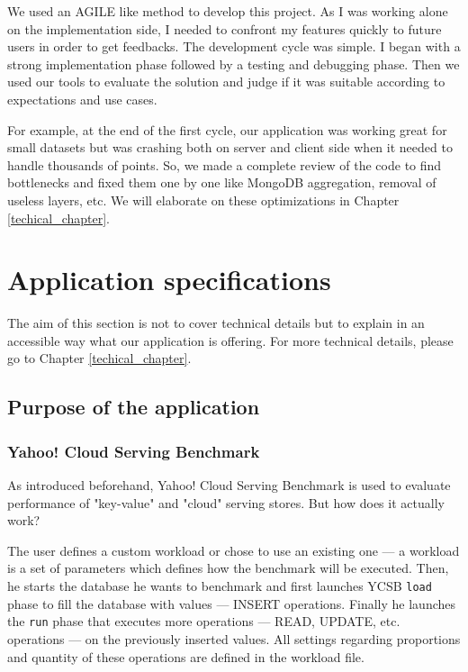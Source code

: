 \documentclass[a4paper,11pt]{report}
\begin{document}
We used an AGILE like method to develop this project. As I was working alone on the implementation side, I needed to confront my features quickly to future users in order to get feedbacks.
The development cycle was simple. I began with a strong implementation phase followed by a testing and debugging phase. Then we used our tools to evaluate the solution and judge if it was suitable according to expectations and use cases.

For example, at the end of the first cycle, our application was working great for small datasets but was crashing both on server and client side when it needed to handle thousands of points.
So, we made a complete review of the code to find bottlenecks and fixed them one by one like MongoDB aggregation, removal of useless layers, etc. We will elaborate on these optimizations in Chapter \ref{techical_chapter}.

\section{Application specifications}

The aim of this section is not to cover technical details but to explain in an accessible way what our application is offering. For more technical details, please go to Chapter \ref{techical_chapter}.

\subsection{Purpose of the application}

\subsubsection{Yahoo! Cloud Serving Benchmark}\label{ycsb}

As introduced beforehand, Yahoo! Cloud Serving Benchmark is used to evaluate performance of "key-value" and "cloud" serving stores. But how does it actually work?

The user defines a custom workload or chose to use an existing one --- a workload is a set of parameters which defines how the benchmark will be executed. Then, he starts the database he wants to benchmark and first launches YCSB \texttt{load} phase to fill the database with values --- INSERT operations. Finally he launches the \texttt{run} phase that executes more operations --- READ, UPDATE, etc. operations --- on the previously inserted values. All settings regarding proportions and quantity of these operations are defined in the workload file.
\end{document}

